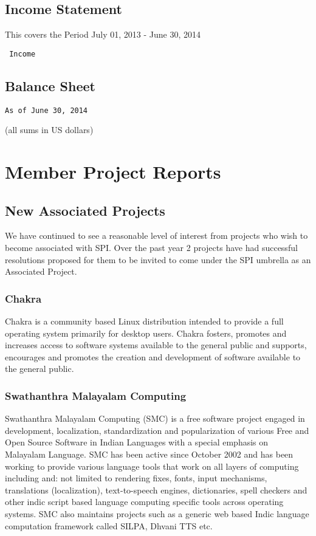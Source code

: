 \documentclass[letterpaper]{report}
\begin{document}
\section{Income Statement}

This covers the Period July 01, 2013 - June 30, 2014

\begin{verbatim}
 Income
\end{verbatim}

\section{Balance Sheet}

\begin{verbatim}
As of June 30, 2014
\end{verbatim}

(all sums in US dollars)


\chapter{Member Project Reports}

\section{New Associated Projects}

We have continued to see a reasonable level of interest from projects who wish
to become associated with SPI. Over the past year 2 projects have had
successful resolutions proposed for them to be invited to come under the SPI
umbrella as an Associated Project.


\subsection{Chakra}

Chakra is a community based Linux distribution intended to provide a full
operating system primarily for desktop users.  Chakra fosters, promotes and
increases access to software systems available to the general public and
supports, encourages and promotes the creation and development of software
available to the general public.


\subsection{Swathanthra Malayalam Computing}

Swathanthra Malayalam Computing (SMC) is a free software project engaged
in development, localization, standardization and popularization of
various Free and Open Source Software in Indian Languages with a special
emphasis on Malayalam Language. SMC has been active since October 2002 and
has been working to provide various language tools that work on all layers
of computing including and: not limited to rendering fixes, fonts, input
mechanisms, translations (localization), text-to-speech engines,
dictionaries, spell checkers and other indic script based language
computing specific tools across operating systems. SMC also maintains
projects such as a generic web based Indic language computation framework
called SILPA, Dhvani TTS etc.
\end{document}

